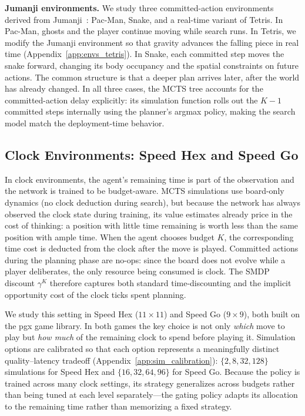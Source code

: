 \textbf{Jumanji environments.}
We study three committed-action environments derived from
Jumanji~\citep{bonnet2024jumanji}: Pac-Man, Snake, and a real-time variant of
Tetris.
In Pac-Man, ghosts and the player continue moving while search runs.
In Tetris, we modify the Jumanji environment so that gravity advances the
falling piece in real time (Appendix~\ref{app:envs_tetris}).
In Snake, each committed step moves the snake forward, changing its body
occupancy and the spatial constraints on future actions.
The common structure is that a deeper plan arrives later, after the world has
already changed.
In all three cases, the MCTS tree accounts for the committed-action delay
explicitly: its simulation function rolls out the $K{-}1$ committed steps
internally using the planner's argmax policy, making the search model match
the deployment-time behavior.

\subsection{Clock Environments: Speed Hex and Speed Go}

In clock environments, the agent's remaining time is part of the observation
and the network is trained to be budget-aware.
MCTS simulations use board-only dynamics (no clock deduction during search),
but because the network has always observed the clock state during training,
its value estimates already price in the cost of thinking: a position with
little time remaining is worth less than the same position with ample time.
When the agent chooses budget $K$, the corresponding time cost is deducted
from the clock after the move is played.
Committed actions during the planning phase are no-ops: since the board does
not evolve while a player deliberates, the only resource being consumed is
clock.
The SMDP discount $\gamma^K$ therefore captures both standard time-discounting
and the implicit opportunity cost of the clock ticks spent planning.

We study this setting in Speed Hex ($11{\times}11$) and Speed Go ($9{\times}9$),
both built on the pgx game library.
In both games the key choice is not only \emph{which} move to play but
\emph{how much} of the remaining clock to spend before playing it.
Simulation options are calibrated so that each option represents a
meaningfully distinct quality--latency tradeoff
(Appendix~\ref{app:sim_calibration}): $\{2,8,32,128\}$ simulations for Speed
Hex and $\{16,32,64,96\}$ for Speed Go.
Because the policy is trained across many clock settings, its strategy
generalizes across budgets rather than being tuned at each level
separately—the gating policy adapts its allocation to the remaining time
rather than memorizing a fixed strategy.
